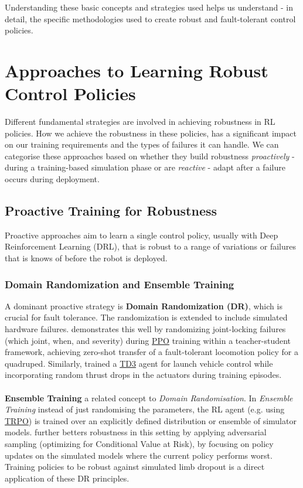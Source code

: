 \documentclass[12pt, a4paper]{article} %
\begin{document}
Understanding these basic concepts and strategies used helps us understand - in detail, the specific methodologies used to create robust and fault-tolerant control policies.

\section{Approaches to Learning Robust Control Policies}
\label{sec:approaches} %

Different fundamental strategies are involved in achieving robustness in RL policies. How we achieve the robustness in these policies, has a significant impact on our training requirements and the types of failures it can handle. We can categorise these approaches based on whether they build robustness \textit{proactively} - during a training-based simulation phase or are \textit{reactive} - adapt after a failure occurs during deployment.
\subsection{Proactive Training for Robustness}
Proactive approaches aim to learn a single control policy, usually with Deep Reinforcement Learning (DRL), that is robust to a range of variations or failures that is knows of before the robot is deployed.

\subsubsection{Domain Randomization and Ensemble Training}
A dominant proactive strategy is \textbf{Domain Randomization (DR)}, which is crucial for fault tolerance. The randomization is extended to include simulated hardware failures. \citet{liu2023saving} demonstrates this well by randomizing joint-locking failures (which joint, when, and severity) during \hyperref[def:ppo]{PPO} training within a teacher-student framework, achieving zero-shot transfer of a fault-tolerant locomotion policy for a quadruped. Similarly, \citet{jia2023robust} trained a \hyperref[def:td3]{TD3} agent for launch vehicle control while incorporating random thrust drops in the actuators during training episodes. \\\\
\textbf{Ensemble Training} a related concept to \textit{Domain Randomisation}. In \textit{Ensemble Training} instead of just randomising the parameters, the RL agent (e.g. using \hyperref[def:trpo] {TRPO}) is trained over an explicitly defined distribution or ensemble of simulator models. \citet{rajeswaran2016epopt} further betters robustness in this setting by applying adversarial sampling (optimizing for Conditional Value at Risk), by focusing on policy updates on the simulated models where the current policy performs worst. Training policies to be robust against simulated limb dropout is a direct application of these DR principles.
\end{document}
